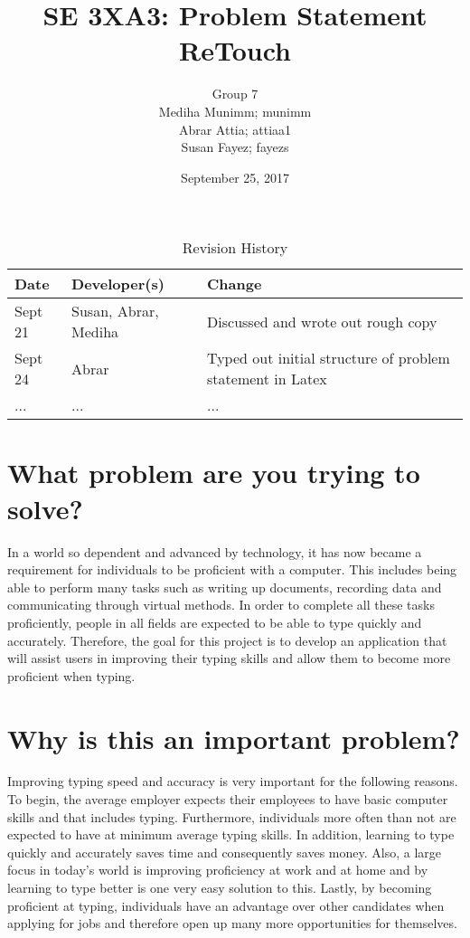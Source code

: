 \documentclass[11pt, oneside]{article}
\title{SE 3XA3: Problem Statement\\ReTouch}
\author{Group 7
		\\ Mediha Munimm; munimm
		\\ Abrar Attia; attiaa1
		\\ Susan Fayez; fayezs}
\date{September 25, 2017}
\begin{document}
\begin{table}[hp]
\caption{Revision History} \label{TblRevisionHistory}
\begin{tabularx}{\textwidth}{llX}
\toprule
\textbf{Date} & \textbf{Developer(s)} & \textbf{Change}\\
\midrule
Sept 21 & Susan, Abrar, Mediha & Discussed and wrote out rough copy\\
Sept 24 & Abrar & Typed out initial structure of problem statement in Latex\\
... & ... & ...\\
\bottomrule
\end{tabularx}
\end{table}

\maketitle
\newpage
\tableofcontents
\newpage

\newpage
\section{What problem are you trying to solve?}

In a world so dependent and advanced by technology, it has now became a requirement for individuals to be proficient with a computer. This includes being able to perform many tasks such as writing up documents, recording data and communicating through virtual methods. In order to complete all these tasks proficiently, people in all fields are expected to be able to type quickly and accurately. Therefore, the goal for this project is to develop an application that will assist users in improving their typing skills and allow them to become more proficient when typing. 

\section{Why is this an important problem?}

Improving typing speed and accuracy is very important for the following reasons. To begin, the average employer expects their employees to have basic computer skills and that includes typing. Furthermore, individuals more often than not are expected to have at minimum average typing skills. In addition, learning to type quickly and accurately saves time and consequently saves money. Also, a large focus in today's world is improving proficiency at work and at home and by learning to type better is one very easy solution to this. Lastly, by becoming proficient at typing, individuals have an advantage over other candidates when applying for jobs and therefore open up many more opportunities for themselves.
\end{document}
